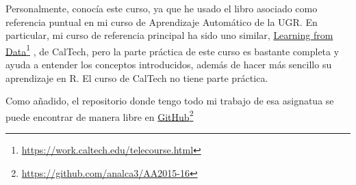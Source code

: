 \documentclass[a4paper, 11pt]{article}
\newcommand\fnurl[2]{%
  \href{#2}{#1}\footnote{\url{#2}}%
}
\theoremstyle{definition}
\begin{document}
  Personalmente, conocía este curso, ya que he usado el libro asociado como referencia puntual en mi curso de Aprendizaje Automático de la UGR. En particular, mi curso de referencia principal ha sido uno similar, \fnurl{Learning from Data}{https://work.caltech.edu/telecourse.html}, de CalTech, pero la parte práctica de este curso es bastante completa y ayuda a entender los conceptos introducidos, además de hacer más sencillo su aprendizaje en R. El curso de CalTech no tiene parte práctica.

  Como añadido, el repositorio donde tengo todo mi trabajo de esa asignatua se puede encontrar de manera libre en \fnurl{GitHub}{https://github.com/analca3/AA2015-16}
\end{document}
